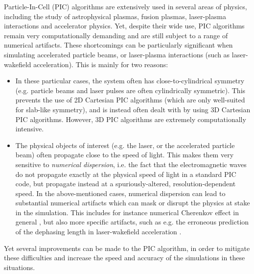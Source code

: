 \documentclass[1p,times,authoryear]{elsarticle}
\begin{document}
Particle-In-Cell (PIC) algorithms \citep{Birdsall2004,Hockney1988} 
are extensively used in several areas of physics, including the study
of astrophysical plasmas, fusion plasmas, laser-plasma
interactions and accelerator physics. Yet,
despite their wide use, PIC algorithms remain very computationally
demanding and are still subject to a range of numerical artifacts. 
These shortcomings can be particularly significant when simulating 
accelerated particle beams, or 
laser-plasma interactions (such as laser-wakefield acceleration). 
This is mainly for two reasons:
\begin{itemize}
\item In these particular cases, the system often has close-to-cylindrical
  symmetry (e.g. particle beams and laser pulses are often
  cylindrically symmetric). This prevents the use of 2D Cartesian 
PIC algorithms (which are only well-suited for slab-like symmetry),
and is instead often dealt with by using
  3D Cartesian PIC algorithms. However, 3D PIC algorithms are extremely
  computationally intensive.
\item The physical objects of interest (e.g. the laser, or the
  accelerated particle beam) often propagate close to the speed of
  light. This makes them very sensitive to \emph{numerical
    dispersion}, i.e. the fact that the electromagnetic waves do not
  propagate exactly at the physical speed of light in a standard PIC
  code, but propagate instead at a spuriously-altered,
  resolution-dependent speed. In the above-mentioned cases, 
numerical dispersion can lead to substantial numerical artifacts
which can mask or disrupt the physics at stake in the simulation. This
includes for instance numerical Cherenkov effect in general
\citep{GodfreyJCP1974}, but also more specific artifacts, such as
e.g. the erroneous prediction of the dephasing length in
laser-wakefield acceleration \citep{CowanPRSTAB2013}.

\end{itemize}
Yet several improvements can be made to the PIC algorithm, in order
to mitigate these difficulties and increase the speed and
accuracy of the simulations in these situations. 
\end{document}

